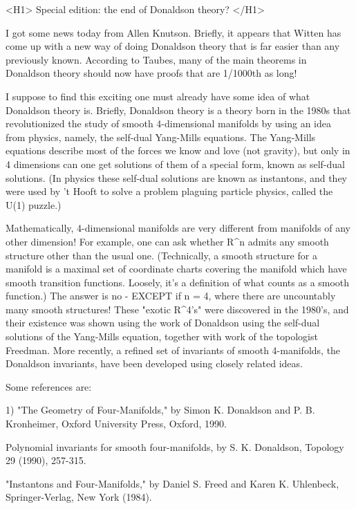 

<H1> Special edition: the end of Donaldson theory? </H1>

I got some news today from Allen Knutson.  Briefly, it appears that
Witten has come up with a new way of doing Donaldson theory that is far
easier than any previously known.  According to Taubes, many of the main
theorems in Donaldson theory should now have proofs that are 1/1000th as
long!

I suppose to find this exciting one must already have some idea of what
Donaldson theory is.  Briefly, Donaldson theory is a theory born in the
1980s that revolutionized the study of smooth 4-dimensional manifolds by
using an idea from physics, namely, the self-dual Yang-Mills equations.
The Yang-Mills equations describe most of the forces we know and love
(not gravity), but only in 4 dimensions can one get solutions of them of
a special form, known as self-dual solutions.  (In physics these
self-dual solutions are known as instantons, and they were used by 't
Hooft to solve a problem plaguing particle physics, called the U(1)
puzzle.)

Mathematically, 4-dimensional manifolds are very different from
manifolds of any other dimension!  For example, one can ask whether R^n
admits any smooth structure other than the usual one.  (Technically, a
smooth structure for a manifold is a maximal set of coordinate charts
covering the manifold which have smooth transition functions.  Loosely,
it's a definition of what counts as a smooth function.)  The answer is
no - EXCEPT if n = 4, where there are uncountably many smooth structures!
These "exotic R^4's" were discovered in the 1980's, and their existence
was shown using the work of Donaldson using the self-dual solutions of
the Yang-Mills equation, together with work of the topologist Freedman. 
More recently, a refined set of invariants of smooth 4-manifolds, the
Donaldson invariants, have been developed using closely related ideas.

Some references are:


1) "The Geometry of Four-Manifolds," by Simon K. Donaldson and P. B.
Kronheimer, Oxford University Press, Oxford, 1990.

Polynomial invariants for smooth four-manifolds, by S. K. Donaldson,
Topology 29 (1990), 257-315.

"Instantons and Four-Manifolds," by Daniel S. Freed and Karen K.
Uhlenbeck, Springer-Verlag, New York (1984). 

